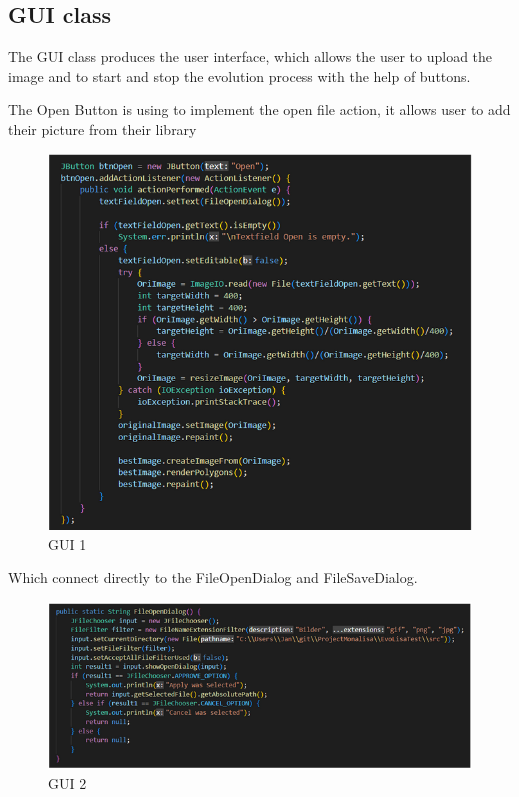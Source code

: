 \subsection{GUI class }
\label{GUI class}
The GUI class produces the user interface, which allows the user to upload the image and to start and stop the evolution process with the help of buttons.

The  Open Button is using to implement the open file action, it allows user to add their picture from their library


\begin{figure}
\centering
\includegraphics[width=4.5in]{images/gui.png}

\caption{GUI 1}
\end{figure}
\newpage

Which connect directly to the FileOpenDialog and FileSaveDialog. 
\begin{figure}
\centering
\includegraphics[width=4.5in]{images/gui2.png}
\caption{GUI 2}
\end{figure}

